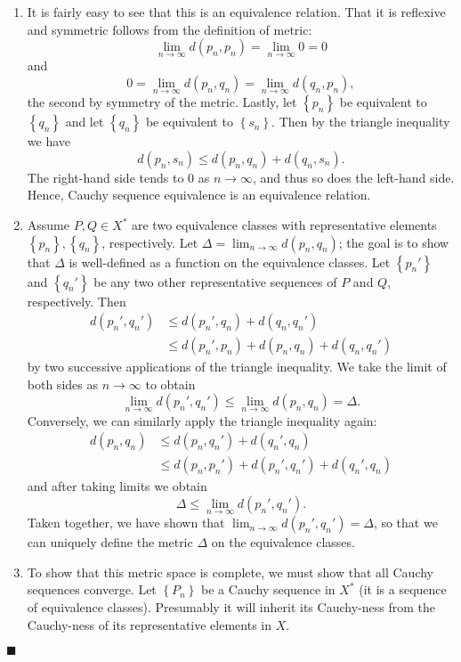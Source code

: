 \documentclass[12pt]{article}
\renewcommand{\qed}{\hfill$\blacksquare$}
\renewenvironment{proof}{\begin{addmargin}[1em]{0em}\begin{newproof}}{\end{newproof}\end{addmargin}\qed}
\begin{document}
\begin{proof}
\begin{enumerate}[label=(\alph*)]
	\item It is fairly easy to see that this is an equivalence relation. That it is reflexive and symmetric follows from the definition of metric: $$ \lim_{n\rightarrow \infty} d\left(p_n,p_n\right) = \lim_{n\rightarrow \infty} 0 = 0 $$ and $$ 0 = \lim_{n\rightarrow \infty} d\left(p_n,q_n\right) = \lim_{n\rightarrow \infty} d\left(q_n,p_n\right),$$ the second by symmetry of the metric. Lastly, let $\left\{ p_n \right\}$ be equivalent to $\left\{ q_n\right\}$ and let $\left\{q_n \right\}$ be equivalent to $\left\{ s_n\right\}$. Then by the triangle inequality we have $$ d\left(p_n,s_n\right) \leq d\left(p_n,q_n\right) + d\left(q_n,s_n\right). $$ The right-hand side tends to $0$ as $n\rightarrow \infty$, and thus so does the left-hand side. Hence, Cauchy sequence equivalence is an equivalence relation.
	
	\item Assume $P,Q\in X^*$ are two equivalence classes with representative elements $\left\{p_n\right\}, \left\{q_n\right\}$, respectively. Let $\Delta = \lim_{n\rightarrow \infty} d\left(p_n,q_n\right)$; the goal is to show that $\Delta$ is well-defined as a function on the equivalence classes. Let $\left\{p_n'\right\}$ and $\left\{q_n'\right\}$ be any two other representative sequences of $P$ and $Q$, respectively. Then
	\begin{align*}
		d\left(p_n',q_n'\right) & \leq d\left(p_n',q_n\right) + d\left(q_n,q_n'\right)  \\
		& \leq d\left(p_n',p_n\right) + d\left(p_n,q_n\right) +  d\left(q_n,q_n'\right) 
	\end{align*}
	by two successive applications of the triangle inequality. We take the limit of both sides as $n\rightarrow \infty$ to obtain $$ \lim_{n\rightarrow \infty} d\left(p_n',q_n'\right) \leq  \lim_{n\rightarrow \infty} d\left(p_n,q_n\right) = \Delta. $$ Conversely, we can similarly apply the triangle inequality again: 
	\begin{align*}
		d\left(p_n,q_n\right) & \leq d\left(p_n,q_n'\right) + d\left(q_n',q_n\right)  \\
		& \leq d\left(p_n,p_n'\right) + d\left(p_n',q_n'\right) +  d\left(q_n',q_n\right) 
	\end{align*}
	and after taking limits we obtain
	$$ \Delta \leq \lim_{n\rightarrow \infty} d\left(p_n',q_n'\right). $$ Taken together, we have shown that $\lim_{n\rightarrow \infty} d\left(p_n',q_n'\right) = \Delta$, so that we can uniquely define the metric $\Delta$ on the equivalence classes.
	
	\item To show that this metric space is complete, we must show that all Cauchy sequences converge. Let $\left\{P_n\right\}$ be a Cauchy sequence in $X^*$ (it is a sequence of equivalence classes). Presumably it will inherit its Cauchy-ness from the Cauchy-ness of its representative elements in $X$.
	
\end{enumerate}
\end{proof}
\end{document}
